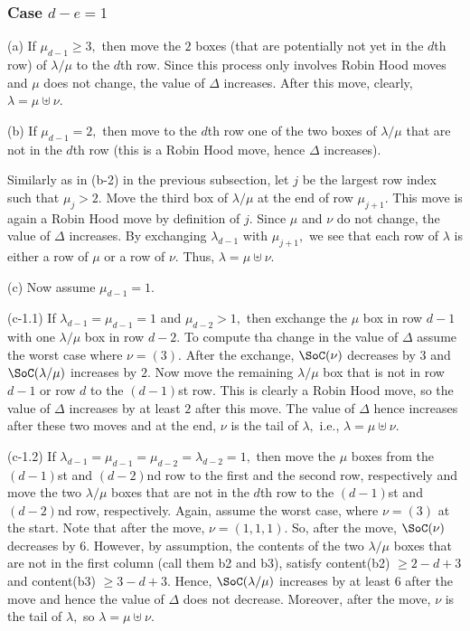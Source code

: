 \documentclass[12pt,dvipsnames,accepted=2016-08-18,a4paper,onecolumn]{quantumarticle}
\def\la{\lambda}
\def\la{\lambda}
\numberwithin{equation}{section}
\theoremstyle{definition}
\begin{document}
\subsubsection{Case $d-e=1$}

(a) If $\mu_{d-1}\geq 3,$ then move the $2$ boxes (that are potentially not yet in the $d$th row) of $\la / \mu$ to the $d$th row. Since this process only involves Robin Hood moves and $\mu$ does not change, the value of $\Delta$ increases. After this move, clearly, $\lambda=\mu\uplus\nu.$

(b) If $\mu_{d-1}=2,$ then move to the $d$th row one of the two boxes of $\la/\mu$ that are not in the $d$th row (this is a Robin Hood move, hence $\Delta$ increases). 

Similarly as in (b-2) in the previous subsection, let $j$ be the largest row index such that $\mu_j>2.$ Move the third box of $\la/\mu$ at the end of row $\mu_{j+1}.$ This move is again a Robin Hood move by definition of $j.$ Since $\mu$ and $\nu$ do not change, the value of $\Delta$ increases. By exchanging $\la_{d-1}$ with $\mu_{j+1},$ we see that each row of $\la$ is either a row of $\mu$ or a row of $\nu.$ Thus, $\lambda=\mu\uplus\nu.$


(c) Now assume $\mu_{d-1}=1.$


(c-1.1) If $\lambda_{d-1} = \mu_{d-1}=1$ and $\mu_{d-2}>1,$ then exchange the $\mu$ box in row $d-1$ with one $\la/\mu$ box in row $d-2.$ To compute tha change in the value of $\Delta$ assume the worst case where $\nu=(3).$  After the exchange, $\SoC(\nu)$ decreases by $3$ and $\SoC(\la/\mu)$ increases by $2.$
Now move the remaining $\la/\mu$ box that is not in row $d-1$ or row $d$ to the $(d-1)$st row. This is clearly a Robin Hood move, so the value of $\Delta $ increases by at least $2$ after this move. The value of $\Delta$ hence increases after these two moves and at the end, $\nu$ is the tail of $\la,$ i.e., $\lambda=\mu\uplus\nu.$



(c-1.2) If $\lambda_{d-1} = \mu_{d-1}=\mu_{d-2}=\la_{d-2}=1,$ then move the $\mu$ boxes from the $(d-1)$st and $(d-2)$nd row to the first and the second row, respectively and move the two $\la/\mu$ boxes that are not in the $d$th row to the $(d-1)$st and $(d-2)$nd row, respectively. 
Again, assume the worst case, where $\nu = (3)$ at the start.
Note that after the move, $\nu=(1,1,1).$  So, after the move, $\SoC(\nu)$ decreases by $6.$
However, by assumption, the contents of the two $\la/\mu$ boxes  that are not in the first column (call them b2 and b3), satisfy content(b2) $\geq 2-d+3$ and content(b3) $\geq 3-d+3.$
Hence, $\SoC(\la/\mu)$ increases by at least $6$ after the move and hence the value of $\Delta$ does not decrease.
Moreover, after the move, $\nu$ is the tail of $\la,$ so $\lambda=\mu\uplus\nu.$
\end{document}
